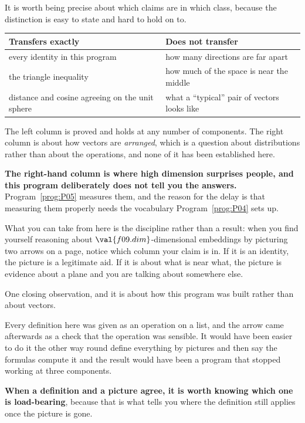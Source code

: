 \begin{fr}
It is worth being precise about which claims are in which class, because the
distinction is easy to state and hard to hold on to.

\begin{center}
\begin{tabularx}{\linewidth}{@{}lX@{}}
\toprule
Transfers exactly & Does not transfer \\
\midrule
every identity in this program & how many directions are far apart \\
the triangle inequality & how much of the space is near the middle \\
distance and cosine agreeing on the unit sphere & what a
  \enquote{typical} pair of vectors looks like \\
\bottomrule
\end{tabularx}
\end{center}

The left column is proved and holds at any number of components. The right
column is about how vectors are \emph{arranged}, which is a question about
distributions rather than about the operations, and none of it has been
established here.

\begin{warning}
\textbf{The right-hand column is where high dimension surprises people, and
this program deliberately does not tell you the answers.}
Program~\ref{prog:P05} measures them, and the reason for the delay is that
measuring them properly needs the vocabulary Program~\ref{prog:P04} sets up.

What you can take from here is the discipline rather than a result: when you
find yourself reasoning about $\val{f09.dim}$-dimensional embeddings by
picturing two arrows on a page, notice which column your claim is in. If it is
an identity, the picture is a legitimate aid. If it is about what is near what,
the picture is evidence about a plane and you are talking about somewhere else.
\end{warning}
\end{fr}

\begin{fr}
One closing observation, and it is about how this program was built rather
than about vectors.

Every definition here was given as an operation on a list, and the arrow came
afterwards as a check that the operation was sensible. It would have been
easier to do it the other way round \dash{} define everything by pictures and
then say the formulas compute it \dash{} and the result would have been a
program that stopped working at three components.

\textbf{When a definition and a picture agree, it is worth knowing which one
is load-bearing}, because that is what tells you where the definition still
applies once the picture is gone.
\end{fr}

